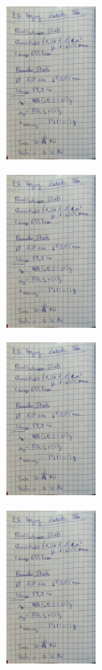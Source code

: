 \begin{minipage}[t]{0.4\textwidth}
    \includegraphics[height=5cm, page=9]{Inhalte/v103_messdaten.pdf}
\end{minipage}

\begin{minipage}[t]{0.4\textwidth}
    \includegraphics[height=5cm, page=10]{Inhalte/v103_messdaten.pdf}
\end{minipage}

\begin{minipage}[t]{0.4\textwidth}
    \includegraphics[height=5cm, page=11]{Inhalte/v103_messdaten.pdf}
\end{minipage}

\begin{minipage}[t]{0.4\textwidth}
    \includegraphics[height=5cm, page=12]{Inhalte/v103_messdaten.pdf}
\end{minipage}